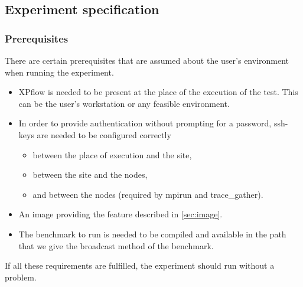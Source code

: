 \subsection{Experiment specification}
\subsubsection{Prerequisites}
There are certain prerequisites that are assumed about the user's
environment when running the experiment.
\begin{itemize}
\item XPflow is needed to be present at the place of the execution of
the test. This can be the user's workstation or any feasible
environment.
\item In order to provide authentication without prompting for a
password, ssh-keys are needed to be configured correctly
  \begin{itemize}
  \item between the place of execution and the site,
  \item between the site and the nodes,
  \item and between the nodes (required by mpirun and trace\_gather).
  \end{itemize}
\item An image providing the feature described in \ref{sec:image}.
\item The benchmark to run is needed to be compiled and available in
  the path that we give the broadcast method of the benchmark.
\end{itemize}
If all these requirements are fulfilled, the experiment should run
without a problem.
